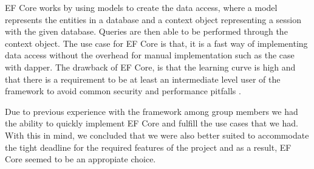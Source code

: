 EF Core works by using models to create the data access, where a model represents the entities in a database and a context object representing a session with the given database. Queries are then able to be performed through the context object. 
The use case for EF Core is that, it is a fast way of implementing data access without the overhead for manual implementation such as the case with dapper. 
The drawback of EF Core, is that the learning curve is high and that there is a requirement to be at least an intermediate level user of the framework to avoid common security and performance pitfalls \cite{EFCore}.

Due to previous experience with the framework among group members we had the ability to quickly implement EF Core and fulfill the use cases that we had. With this in mind, we concluded that we were also better suited to accommodate the tight deadline for the required features of the \knox{} project and as a result, EF Core seemed to be an appropiate choice.


